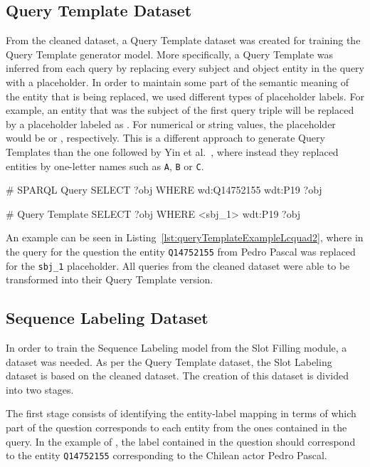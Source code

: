 \subsection{Query Template Dataset}
\label{cap4:experimentalDesign/QaDataset/queryTemplate}
From the cleaned \LCQuADtwo{} dataset, a Query Template dataset was created for training the 
Query Template generator model. More specifically, a Query Template was inferred from each 
\SPARQL{} query by replacing every subject and object entity in the query with a placeholder. In 
order to maintain some part of the semantic meaning of the entity that is being replaced, we 
used different types of placeholder labels. For example, an entity that was the subject of the 
first query triple will be replaced by a placeholder labeled as . For numerical 
or string values, the placeholder would be  or , respectively. 
This is a different approach to generate Query Templates than the one followed by 
Yin et al.~\cite{nmt:nl-to-sparql-Yin19}, where instead they replaced entities by one-letter 
names such as \texttt{A}, \texttt{B} or \texttt{C}. 

\begin{sparqlcode}[%
    caption={\SPARQL{} query and its Query Template version.}, 
    label={lst:queryTemplateExampleLcquad2}]
# SPARQL Query
SELECT ?obj WHERE { wd:Q14752155 wdt:P19 ?obj }

# Query Template
SELECT ?obj WHERE { <sbj_1> wdt:P19 ?obj }
\end{sparqlcode}

An example can be seen in Listing~\ref{lst:queryTemplateExampleLcquad2}, where in the \SPARQL{} 
query for the question  the entity \texttt{Q14752155} 
from Pedro Pascal was replaced for the \texttt{sbj\_1} placeholder. All queries from the cleaned dataset 
were able to be transformed into their Query Template version.

\subsection{Sequence Labeling Dataset}
\label{cap4:experimentalDesign/QaDataset/seqLabeling}
In order to train the Sequence Labeling model from the Slot Filling module, a dataset was 
needed. As per the Query Template dataset, the Slot Labeling dataset is based on the cleaned 
\LCQuADtwo{} dataset. The creation of this dataset is divided into two stages. 

The first stage consists of identifying the entity-label mapping in terms of which part of the 
question corresponds to each entity from the ones contained in the \SPARQL{} query. In the example 
of , the label  contained in the 
question should correspond to the entity \texttt{Q14752155} corresponding to the Chilean actor Pedro 
Pascal. 

